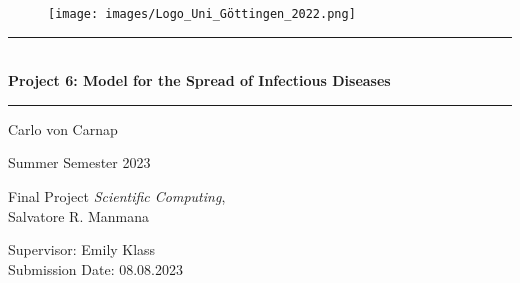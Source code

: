\begin{titlepage}
    \centering
    \vspace*{1.5cm}
    \begin{figure}[H]
        \texttt{[image: images/Logo\_Uni\_Göttingen\_2022.png]}
    \end{figure}
    \vspace*{2.2cm}
    
    \rule{\textwidth}{1pt}\\[0.5cm]
    {\huge \bfseries
      Project 6: Model for the Spread of Infectious Diseases}\\
    \rule{\textwidth}{1pt}
    
    \vspace*{2.7cm}
    
    {\large Carlo von Carnap\\
    
    \vspace*{0.7cm}

    Summer Semester 2023}
    
    \vspace*{4cm}

    {\large Final Project \textit{Scientific Computing}, \\
    Salvatore R. Manmana

    \vspace*{0.7cm}
    
    Supervisor: Emily Klass \\
    Submission Date: 08.08.2023}

    \end{titlepage}